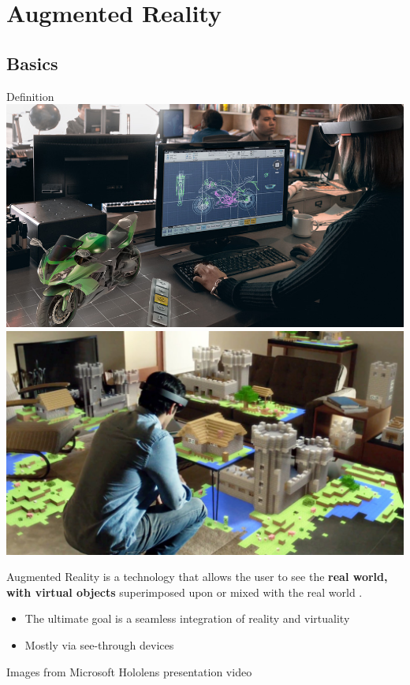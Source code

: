 \documentclass[presentation]{beamer} %
\begin{document}
\section{Augmented Reality}
\subsection{Basics}
\begin{frame}{Definition}
  \includegraphics[width=.49\textwidth]{images/holobike}
  \includegraphics[width=.49\textwidth]{images/holominecraft}
  \begin{block}{Augmented Reality}
    is a technology that allows the user to see the \textbf{real world, with virtual objects} superimposed upon or mixed with the real world \cite{Azuma97}.
    \begin{itemize}
      \item The ultimate goal is a seamless integration of reality and virtuality
      \item Mostly via see-through devices
    \end{itemize}
  \end{block}
  \begin{center}
    \tiny{Images from Microsoft Hololens presentation video}
  \end{center}
\end{frame}
\end{document}
